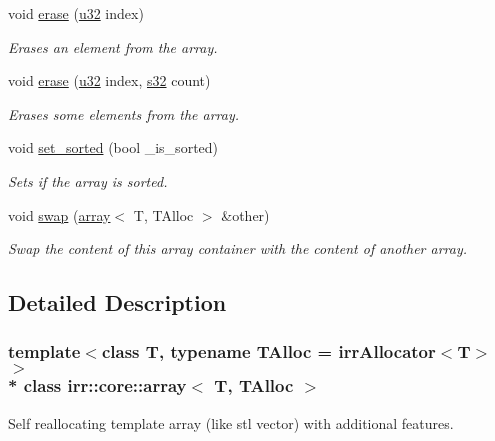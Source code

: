 \begin{DoxyCompactItemize}
void \hyperlink{classirr_1_1core_1_1array_a5ba14e37dddaecd9c3e813a78c157dc8}{erase} (\hyperlink{namespaceirr_a0416a53257075833e7002efd0a18e804}{u32} index)
\begin{DoxyCompactList}\small\item\em Erases an element from the array. \end{DoxyCompactList}\item 
void \hyperlink{classirr_1_1core_1_1array_ab9bb8cb0e6ebc4839fa2f7bc8e626800}{erase} (\hyperlink{namespaceirr_a0416a53257075833e7002efd0a18e804}{u32} index, \hyperlink{namespaceirr_ac66849b7a6ed16e30ebede579f9b47c6}{s32} count)
\begin{DoxyCompactList}\small\item\em Erases some elements from the array. \end{DoxyCompactList}\item 
void \hyperlink{classirr_1_1core_1_1array_ab73d5838db931996f66f9efcc7127b49}{set\+\_\+sorted} (bool \+\_\+is\+\_\+sorted)\hypertarget{classirr_1_1core_1_1array_ab73d5838db931996f66f9efcc7127b49}{}\label{classirr_1_1core_1_1array_ab73d5838db931996f66f9efcc7127b49}

\begin{DoxyCompactList}\small\item\em Sets if the array is sorted. \end{DoxyCompactList}\item 
void \hyperlink{classirr_1_1core_1_1array_a8857046f500a2990fc9930b204a3dbad}{swap} (\hyperlink{classirr_1_1core_1_1array}{array}$<$ T, T\+Alloc $>$ \&other)
\begin{DoxyCompactList}\small\item\em Swap the content of this array container with the content of another array. \end{DoxyCompactList}\end{DoxyCompactItemize}


\subsection{Detailed Description}
\subsubsection*{template$<$class T, typename T\+Alloc = irr\+Allocator$<$\+T$>$$>$\\*
class irr\+::core\+::array$<$ T, T\+Alloc $>$}

Self reallocating template array (like stl vector) with additional features. 

